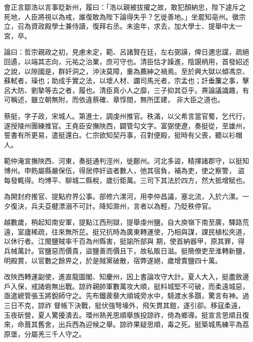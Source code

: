 \begin{pinyinscope}
 會正言鄒浩以言事貶新州，履曰：「浩以親被拔擢之故，敢犯顏納忠，陛下遽斥之死地，人臣將視以為戒，誰復敢為陛下論得失乎？乞徙善地。」坐罷知亳州。徽宗立，召為資政殿學士兼侍讀，復拜右丞。未逾年，求去，加大學士、提舉中太一宮，卒。



 論曰：哲宗親政之初，見慮未定，範、呂諸賢在廷，左右弼謨，俾日邇忠讜，疏絕回遹，以端其志向，元祐之治業，庶可守也。清臣怙才躁進，陰覬柄用，首發紹述之說，以隙國是，群奸洞之，沖決莫障，重為薦紳之禍焉。至於興大獄以傾馮京、蘇軾者，璪也；助成手實之法，以壞人材、讕司馬光者，宗孟也；訐垂簾之事，擊呂大防、劉摯等去之者，履也。清臣真小人之靡，三子抑其亞乎。燾論議識趣，有可稱述，雖立朝無附，而依違蔡確、章惇間，無所匡建，
 非大臣之道也。



 蔡挺，字子政，宋城人。第進士，調虔州推官。秩滿，以父希言當官蜀，乞代行，遂授陵州團練推官。王堯臣安撫陜西，闢管勾文字。富弼使遼，奏挺從，至雄州，誓書有所更易，遣挺還白。仁宗欲知契丹事，召對便殿，挺時有父喪，聽以衫帽人。



 範仲淹宣撫陜西、河東，奏挺通判涇州，徙鄜州。河北多盜，精擇諸郡守，以挺知博州。申飭屬縣嚴保伍，得居停奸盜者數人，弛其宿負，補為吏，使之察警，
 盜每發輒得。均博平、聊城二縣稅，歲衍鉅萬。三司下其法於四方，然大抵增賦也。



 為開封府推官、提點府界公事。部修六漯河，用李仲昌議，塞北流，入於六漯。一夕復決，兵夫芟楗漂溺不可計。降知滁州，言者以為輕，乃貶秩停官。



 越數歲，稍起知南安軍，提點江西刑獄，提舉虔州鹽。自大庾嶺下南至廣，驛路荒遠，室廬稀疏，往來無所芘。挺兄抗時為廣東轉運使，乃相與謀，課民植松夾道，以休行者。江閩鹽賊率千百為州縣害，挺諭所部與
 期，使首納器甲，原其罪，得兵械萬計。官鹽惡而價貴，盜鹽善而價且下，故私販日滋。挺簡僚吏至淮轉新鹽，明殿賞，以官數之餘畀之，於是賊黨破散，宿弊遂絕，歲增賣鹽四十萬。



 改陜西轉運副使，進直龍圖閣、知慶州，因上書論攻守大計。夏人大入，挺盡斂邊戶入保，戒諸砦無出戰。諒祚親帥軍數萬攻大順，挺料城堅不可破，而柔遠城惡，亟遣總管張玉將銳師守之。先布鐵蒺藜大順城旁水中，騎渡水多躓，驚言有神。過三日不克，諒祚
 督帳下決戰，挺伏強弩壕外，飛矢貫其鎧，遂引卻。移寇柔遠，玉夜斫營，夏人驚擾潰去。環州熟羌思順舉族投諒祚，倚為鄉導。挺宣言思順且復來，命葺其舊舍，出兵西為迎候之舉。諒祚果疑思順，毒之死。挺築城馬練平為荔原堡，分屬羌三千人守之。




\end{pinyinscope}
